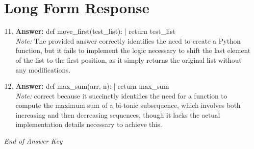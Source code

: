 \documentclass[12pt]{article}
\begin{document}
\section*{Long Form Response}
\begin{enumerate}[label=\arabic*.]
\setcounter{enumi}{10}
\item \textbf{Answer:} def move\_first(test\_list): | return test\_list
\\ \textit{Note:} The provided answer correctly identifies the need to create a Python function, but it fails to implement the logic necessary to shift the last element of the list to the first position, as it simply returns the original list without any modifications.
\item \textbf{Answer:} def max\_sum(arr, n): | return max\_sum
\\ \textit{Note:} correct because it succinctly identifies the need for a function to compute the maximum sum of a bi-tonic subsequence, which involves both increasing and then decreasing sequences, though it lacks the actual implementation details necessary to achieve this.
\end{enumerate}

\vfill
\noindent\textit{End of Answer Key}
\end{document}
